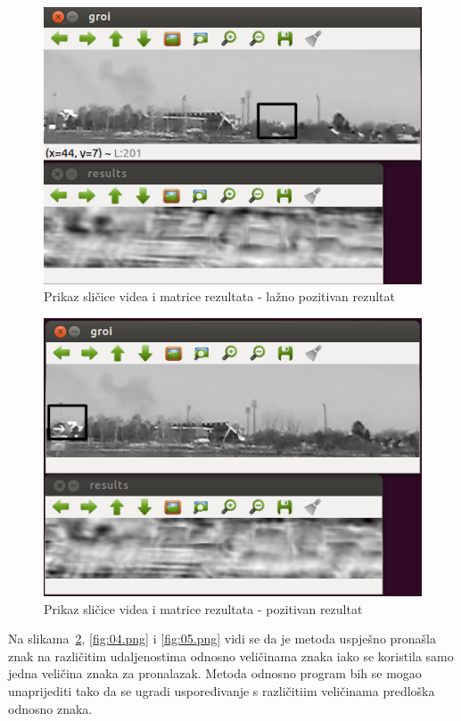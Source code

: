 \begin{figure}[h]
\centering
\includegraphics[scale=0.5]{figures/02.png}
\caption{Prikaz sličice videa i matrice rezultata - lažno pozitivan
rezultat}
\label{fig:02}
\end{figure}

\newpage
\begin{figure}[h]
\centering
\includegraphics[scale=0.5]{figures/03.png}
\caption{Prikaz sličice videa i matrice rezultata - pozitivan rezultat }
\label{fig:03.png}
\end{figure}

Na slikama~\ref{fig:03.png}, \ref{fig:04.png} i \ref{fig:05.png} vidi se
da je metoda uspješno pronašla znak na različitim udaljenostima odnosno
veličinama znaka iako se koristila samo jedna veličina znaka za
pronalazak. Metoda odnosno program bih se mogao unaprijediti tako da se
ugradi uspoređivanje s različitiim veličinama predloška odnosno znaka.

